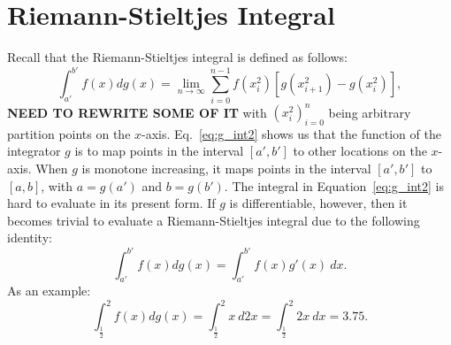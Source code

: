 \documentclass{article}
\theoremstyle{theorem}
\theoremstyle{definition}
\begin{document}
\section{Riemann-Stieltjes Integral}
Recall that the Riemann-Stieltjes integral is defined as follows:
\begin{equation}
\label{eq:g_int2}
\int_{a'}^{b'} f(x) dg(x) =  \lim_{n \rightarrow \infty}\sum_{i=0}^{n-1} f(x_i^2)[g(x_{i+1}^2)-g(x_{i}^2)], 
\end{equation}
\noindent
\textbf{NEED TO REWRITE SOME OF IT} with $(x_i^2)_{i=0}^n$ being arbitrary partition points on the $x$-axis. Eq.~\eqref{eq:g_int2} shows us that the function of the integrator $g$ is to
map points in the interval $[a',b']$ to other locations on the $x$-axis. When $g$ is monotone increasing, it maps points in the interval $[a',b']$ to $[a,b]$,
with $a = g(a')$ and $b = g(b')$. The integral in Equation~\ref{eq:g_int2} is hard to evaluate in its present form. If $g$ is differentiable, however, then it becomes trivial to 
evaluate a Riemann-Stieltjes integral due to the following identity:
\begin{equation}
\int_{a'}^{b'} f(x) dg(x) = \int_{a'}^{b'} f(x)g'(x)~dx.
\end{equation}
As an example:
\begin{equation}
\int_{\frac{1}{2}}^{2} f(x) dg(x)=\int_{\frac{1}{2}}^2 x~d2x = \int_{\frac{1}{2}}^2 2x~dx = 3.75. 
\end{equation}
\end{document}
